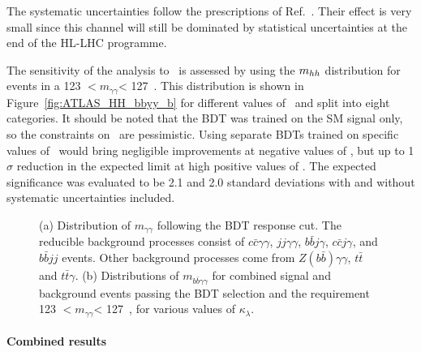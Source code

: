 The systematic uncertainties follow the prescriptions of Ref.~\cite{ATLAS_PERF_Note}. Their effect is very small since this channel will still be dominated by statistical uncertainties at the end of the HL-LHC programme.


The sensitivity of the analysis to \kl\ is assessed by using the $m_{hh}$ distribution for events in a 123 $ < \ensuremath{m_{\gamma\gamma}} $< 127~\GeV. This distribution is shown in Figure~\ref{fig:ATLAS_HH_bbyy_b} for different values of \kl\ and split into eight categories. It should be noted that the BDT was trained on the SM signal only, so the constraints on \kl\ are pessimistic. Using separate BDTs trained on specific values of \kl\ would bring negligible improvements at negative values of \kl, but up to 1$\sigma$ reduction in the expected limit at high positive values of \kl.
The expected significance was evaluated to be 2.1 and 2.0 standard deviations with and without systematic uncertainties included.



\begin{figure}[!htb]
\centering 
{} 
\caption{(a) Distribution of $m_{\gamma\gamma}$ following the BDT response cut. The reducible background processes consist of $c\bar{c}\gamma\gamma$, $jj\gamma\gamma$, $b\bar{b}j\gamma$, $c\bar{c}j\gamma$, and $b\bar{b}jj$ events.  Other background processes come from $Z(b\bar{b})\gamma\gamma$, $t\bar{t}$ and $t\bar{t}\gamma$.
(b) Distributions of $m_{b\bar{b}\gamma\gamma}$ for combined signal and background events passing the BDT selection and the requirement 123 \GeV $ < \ensuremath{m_{\gamma\gamma}} $< 127~\GeV, for various values of $\kappa_{\lambda}$.} 
\label{fig:ATLAS_HH_bbyy} 
\end{figure}


%
\paragraph{Combined results}


